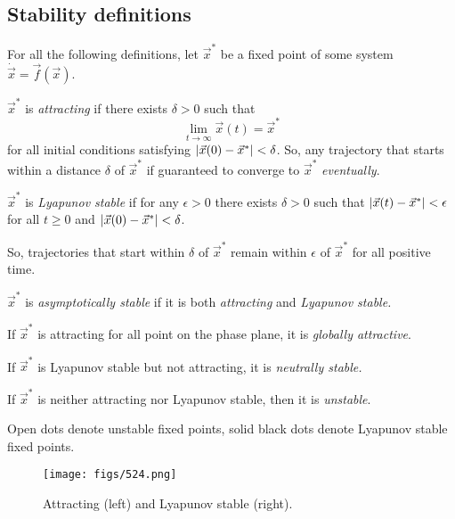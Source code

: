 \documentclass[oneside]{book}
\begin{document}
\subsection{Stability definitions}
For all the following definitions, let $ \vec{x}^* $ be a fixed point of some system $ \dot{\vec{x}} = \vec{f}(\vec{x}) $.
\begin{definition}
	$ \vec{x}^* $ is \textit{attracting} if there exists $ \delta > 0 $ such that 
	\[
	\lim_{t \to \infty} \vec{x}(t) = \vec{x}^* 
	\]
	for all initial conditions satisfying $ \abs{\vec{x}(0) - \vec{x}^*} < \delta $. So, any trajectory that starts within a distance $ \delta $ of $ \vec{x}^* $ if guaranteed to converge to $ \vec{x}^* $ \textit{eventually}.
\end{definition}
\begin{definition}
	$ \vec{x}^* $ is \textit{Lyapunov stable} if for any $ \epsilon > 0 $ there exists $ \delta > 0 $ such that $ \abs{\vec{x}(t) - \vec{x}^*} < \epsilon $ for all $ t \geq 0 $ and $ \abs{\vec{x}(0) - \vec{x}^*} < \delta $.
	\par
	So, trajectories that start within $ \delta $ of $ \vec{x}^* $ remain within $ \epsilon $ of $ \vec{x}^* $ for all positive time.
\end{definition}
\begin{definition} $ \vec{x}^* $ is \textit{asymptotically stable} if it is both \textit{attracting} and \textit{Lyapunov stable.} 
\end{definition}
\begin{definition} If $ \vec{x}^* $ is attracting for all point on the phase plane, it is \textit{globally attractive}. 
\end{definition}
\begin{definition}
	If $ \vec{x}^* $ is Lyapunov stable but not attracting, it is \textit{neutrally stable.}
\end{definition}
\begin{definition} [Unstable]
	If $ \vec{x}^* $ is neither attracting nor Lyapunov stable, then it is \textit{unstable}.
\end{definition}
\begin{note}
	Open dots denote unstable fixed points, solid black dots denote Lyapunov stable fixed points.
\end{note}
\begin{figure}[h]
	\centering
	\texttt{[image: figs/524.png]}
	\caption{Attracting (left) and Lyapunov stable (right).}
\end{figure}
\end{document}
